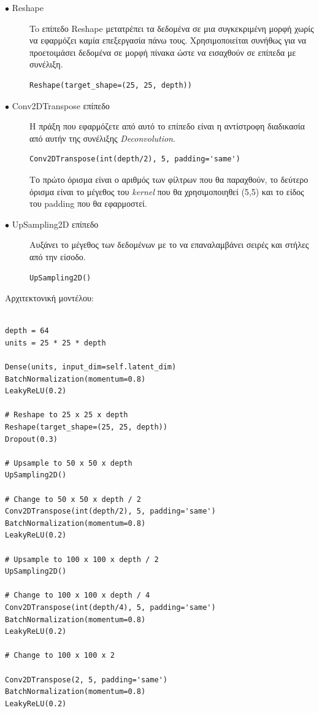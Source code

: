 \begin{description}
\item[$\bullet$ Reshape] To επίπεδο Reshape μετατρέπει τα δεδομένα σε μια συγκεκριμένη μορφή χωρίς να εφαρμόζει καμία επεξεργασία πάνω τους. Χρησιμοποιείται συνήθως για να προετοιμάσει δεδομένα σε μορφή πίνακα ώστε να εισαχθούν σε επίπεδα με συνέλιξη. \cite{reshape}
\par
\begin{verbatim}
Reshape(target_shape=(25, 25, depth))
\end{verbatim}
\end{description}

\begin{description}
\item[$\bullet$ Conv2DTranspose επίπεδο] H πράξη που εφαρμόζετε από αυτό το επίπεδο είναι η αντίστροφη διαδικασία από αυτήν της συνέλιξης \textit{Deconvolution}. \cite{conv2dtranspose}
\begin{verbatim}
Conv2DTranspose(int(depth/2), 5, padding='same')
\end{verbatim}
\par
Το πρώτο όρισμα είναι ο αριθμός των φίλτρων που θα παραχθούν, το δεύτερο όρισμα είναι το μέγεθος του \textit{kernel} που θα χρησιμοποιηθεί (5,5) και το είδος του padding που θα εφαρμοστεί.
\end{description}

\begin{description}
\item[$\bullet$ UpSampling2D επίπεδο] Αυξάνει το μέγεθος των δεδομένων με το να επαναλαμβάνει σειρές και στήλες από την είσοδο. \cite{upsampling2d}
\begin{verbatim}
UpSampling2D() 
\end{verbatim}
\par
\end{description}

Αρχιτεκτονική μοντέλου:
\begin{verbatim}
        
depth = 64
units = 25 * 25 * depth
        
Dense(units, input_dim=self.latent_dim)
BatchNormalization(momentum=0.8)
LeakyReLU(0.2)

# Reshape to 25 x 25 x depth
Reshape(target_shape=(25, 25, depth))
Dropout(0.3)

# Upsample to 50 x 50 x depth
UpSampling2D()

# Change to 50 x 50 x depth / 2
Conv2DTranspose(int(depth/2), 5, padding='same')
BatchNormalization(momentum=0.8)
LeakyReLU(0.2)

# Upsample to 100 x 100 x depth / 2
UpSampling2D()

# Change to 100 x 100 x depth / 4
Conv2DTranspose(int(depth/4), 5, padding='same')
BatchNormalization(momentum=0.8)
LeakyReLU(0.2)

# Change to 100 x 100 x 2
        
Conv2DTranspose(2, 5, padding='same')
BatchNormalization(momentum=0.8)
LeakyReLU(0.2)
\end{verbatim}

